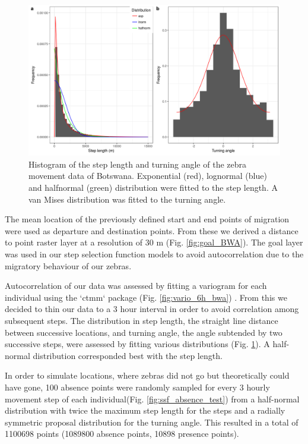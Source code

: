 \documentclass[12pt,a4paper, twoside, english]{article}
\begin{document}
\begin{figure}[H]
  \centering
  \includegraphics[width=\textwidth]{figures/Angle_Dist_BWA.png}
  \caption[Step length and turning angle distribution, Ngamiland]{Histogram of the step length and turning angle of the zebra movement data of Botswana. Exponential (red), lognormal (blue) and halfnormal (green) distribution were fitted to the step length. A van Mises distribution was fitted to the turning angle.}
  \label{fig:angle_dist_bwa}
\end{figure}


The mean location of the previously defined start and end points of migration were used as departure and destination points. From these we derived a distance to point raster layer at a resolution of 30 m (Fig. \ref{fig:goal_BWA}). The goal layer was used in our step selection function models to avoid autocorrelation due to the migratory behaviour of our zebras.


Autocorrelation of our data was assessed by fitting a variogram for each individual using the `ctmm` package (Fig. \ref{fig:vario_6h_bwa}) \citep{Fleming2016}. From this we decided to thin our data to a 3 hour interval in order to avoid correlation among subsequent steps. The distribution in step length, the straight line distance between successive locations, and turning angle, the angle subtended by two successive steps, were assessed by fitting various distributions (Fig. \ref{fig:angle_dist_bwa}). A half-normal distribution corresponded best with the step length. 

In order to simulate locations, where zebras did not go but theoretically could have gone, 100 absence points were randomly sampled for every 3 hourly movement step of each individual(Fig. \ref{fig:ssf_absence_test}) from a half-normal distribution with twice the maximum step length for the steps and a radially symmetric proposal distribution for the turning angle. This resulted in a total of 1100698 points (1089800 absence points, 10898 presence points). 
\end{document}
